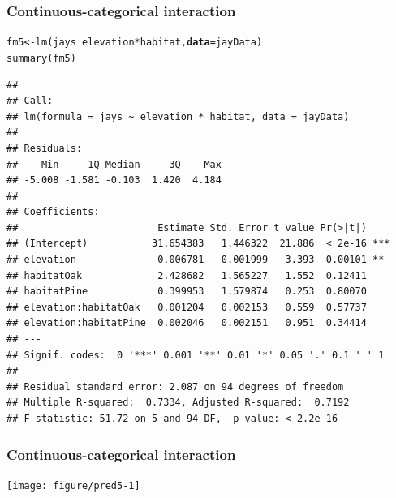\documentclass[color=usenames,dvipsnames]{beamer}\usepackage[]{graphicx}\usepackage[]{color}
\makeatletter
\newcommand{\hlopt}[1]{\textcolor[rgb]{0,0,0}{#1}}%
\newcommand{\hlstd}[1]{\textcolor[rgb]{0,0,0}{#1}}%
\newcommand{\hlkwb}[1]{\textcolor[rgb]{0,0.341,0.682}{#1}}%
\newcommand{\hlkwc}[1]{\textcolor[rgb]{0,0,0}{\textbf{#1}}}%
\newcommand{\hlkwd}[1]{\textcolor[rgb]{0.004,0.004,0.506}{#1}}%
\newenvironment{kframe}{%
 \def\at@end@of@kframe{}%
 \ifinner\ifhmode%
  \def\at@end@of@kframe{\end{minipage}}%
  \begin{minipage}{\columnwidth}%
 \fi\fi%
 \def\FrameCommand##1{\hskip\@totalleftmargin \hskip-\fboxsep
 \colorbox{shadecolor}{##1}\hskip-\fboxsep
     \hskip-\linewidth \hskip-\@totalleftmargin \hskip\columnwidth}%
 \MakeFramed {\advance\hsize-\width
   \@totalleftmargin\z@ \linewidth\hsize
   \@setminipage}}%
 {\par\unskip\endMakeFramed%
 \at@end@of@kframe}
\newenvironment{knitrout}{}{} %
\makeatother
\begin{document}
\begin{frame}[fragile]
  \frametitle{Continuous-categorical interaction}
\begin{knitrout}\scriptsize
{}\color{fgcolor}\begin{kframe}
\begin{alltt}
\hlstd{fm5} \hlkwb{<-} \hlkwd{lm}\hlstd{(jays} \hlopt{~} \hlstd{elevation}\hlopt{*}\hlstd{habitat,} \hlkwc{data}\hlstd{=jayData)}
\hlkwd{summary}\hlstd{(fm5)}
\end{alltt}
\begin{verbatim}
## 
## Call:
## lm(formula = jays ~ elevation * habitat, data = jayData)
## 
## Residuals:
##    Min     1Q Median     3Q    Max 
## -5.008 -1.581 -0.103  1.420  4.184 
## 
## Coefficients:
##                        Estimate Std. Error t value Pr(>|t|)    
## (Intercept)           31.654383   1.446322  21.886  < 2e-16 ***
## elevation              0.006781   0.001999   3.393  0.00101 ** 
## habitatOak             2.428682   1.565227   1.552  0.12411    
## habitatPine            0.399953   1.579874   0.253  0.80070    
## elevation:habitatOak   0.001204   0.002153   0.559  0.57737    
## elevation:habitatPine  0.002046   0.002151   0.951  0.34414    
## ---
## Signif. codes:  0 '***' 0.001 '**' 0.01 '*' 0.05 '.' 0.1 ' ' 1
## 
## Residual standard error: 2.087 on 94 degrees of freedom
## Multiple R-squared:  0.7334,	Adjusted R-squared:  0.7192 
## F-statistic: 51.72 on 5 and 94 DF,  p-value: < 2.2e-16
\end{verbatim}
\end{kframe}
\end{knitrout}
\end{frame}




\begin{frame}[fragile]
  \frametitle{Continuous-categorical interaction}
\begin{knitrout}
\color{fgcolor}
\texttt{[image: figure/pred5-1]} 

\end{knitrout}
\end{frame}
\end{document}
